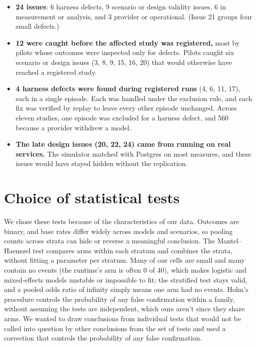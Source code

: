 \documentclass[letterpaper,twocolumn,10pt]{article}
\begin{document}
\begin{itemize}
\item \textbf{24 issues}: 6 harness defects, 9 scenario or design validity issues, 6 in measurement or analysis, and 3 provider or operational. (Issue 21 groups four small defects.)
\item \textbf{12 were caught before the affected study was registered,} most by pilots whose outcomes were inspected only for defects. Pilots caught six scenario or design issues (3, 8, 9, 15, 16, 20) that would otherwise have reached a registered study.
\item \textbf{4 harness defects were found during registered runs} (4, 6, 11, 17), each in a single episode. Each was handled under the exclusion rule, and each fix was verified by replay to leave every other episode unchanged. Across eleven studies, one episode was excluded for a harness defect, and 560 because a provider withdrew a model.
\item \textbf{The late design issues (20, 22, 24) came from running on real services.} The simulator matched with Postgres on most measures, and these issues would have stayed hidden without the replication.
\end{itemize}

\section{Choice of statistical tests}\label{sec:S2}

We chose these tests because of the characteristics of our data. Outcomes are binary, and base rates differ widely across models and scenarios, so pooling counts across strata can hide or reverse a meaningful conclusion. The Mantel--Haenszel test compares arms within each stratum and combines the strata, without fitting a parameter per stratum. Many of our cells are small and many contain no events (the runtime's arm is often 0 of 40), which makes logistic and mixed-effects models unstable or impossible to fit; the stratified test stays valid, and a pooled odds ratio of infinity simply means one arm had no events. Holm's procedure controls the probability of any false confirmation within a family, without assuming the tests are independent, which ours aren't since they share arms. We wanted to draw conclusions from individual tests that would not be called into question by other conclusions from the set of tests and used a correction that controls the probability of any false confirmation.
\end{document}
